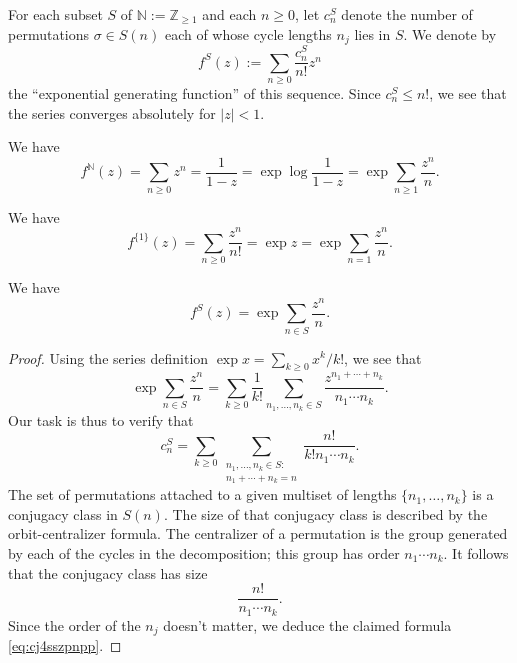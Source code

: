 \documentclass[reqno]{amsart}  \numberwithin{theorem}{section} \numberwithin{equation}{section}
\begin{document}
For each subset $S$ of $\mathbb{N} := \mathbb{Z}_{\geq 1}$ and each $n \geq 0$, let $c_n^S$ denote the number of permutations $\sigma \in S(n)$ each of whose cycle lengths $n_j$ lies in $S$.  We denote by
\begin{equation*}
  f^S(z) := \sum_{n \geq 0} \frac{c_n^S}{n!} z^n
\end{equation*}
the ``exponential generating function'' of this sequence.  Since $c_n^S \leq n!$, we see that the series converges absolutely for $|z| < 1$.
\begin{example}
  We have
  \begin{equation*}
    f^{\mathbb{N} } (z) = \sum_{n \geq 0} z^n = \frac{1}{1-z}
    = \exp \log \frac{1}{1 - z}
    =
    \exp \sum _{n \geq 1} \frac{z^n}{n}.
  \end{equation*}
\end{example}
\begin{example}
  We have
  \begin{equation*}
    f^{\{1\}}(z) = \sum_{n \geq 0} \frac{z^n}{n!} = \exp z
    = \exp \sum_{n = 1} \frac{z^n }{n}.
  \end{equation*}
\end{example}
\begin{lemma}
  We have
  \begin{equation*}
    f^S(z) = \exp \sum_{n \in S} \frac{z^n}{n}.
  \end{equation*}
\end{lemma}
\begin{proof}
  Using the series definition $\exp x = \sum_{k \geq 0} x^k / k!$, we see that
  \begin{equation*}
    \exp \sum_{n \in S} \frac{z^n}{n}
    = \sum_{k \geq 0}
    \frac{1}{k!}
    \sum_{n_1, \dotsc, n_k \in S}
    \frac{z^{n _1 + \dotsb + n_k}}{n_1 \dotsb n_k}.
  \end{equation*}
  Our task is thus to verify that
  \begin{equation}\label{eq:cj4sszpnpp}
    c_n^S = \sum_{k \geq 0}
    \sum_{
      \substack{
        n_1, \dotsc, n_k \in S : \\
        n_1 + \dotsb + n_k = n
      }
    }
    \frac{n!}{k ! n_1 \dotsb n_k}.
  \end{equation}
  The set of permutations attached to a given multiset of lengths $\{n_1, \dotsc, n_k\}$ is a conjugacy class in $S(n)$.  The size of that conjugacy class is described by the orbit-centralizer formula.  The centralizer of a permutation is the group generated by each of the cycles in the decomposition; this group has order $n_1 \dotsb n_k$.  It follows that the conjugacy class has size
  \begin{equation*}
    \frac{n!}{n_1 \dotsb n_k}.
  \end{equation*}
  Since the order of the $n_j$ doesn't matter, we deduce the claimed formula \eqref{eq:cj4sszpnpp}.
\end{proof}
\end{document}
